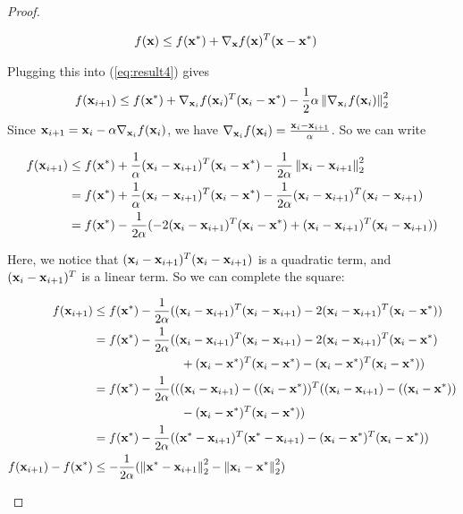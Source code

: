\begin{proof}
\begin{ceqn}
\begin{align*}
            f(\vx) &\leq f(\vx^*) + \nabla_\vx f(\vx)^T(\vx - \vx^*)
        \end{align*}
    \end{ceqn}
    Plugging this into (\ref{eq:result4}) gives
    $$f(\vx_{i+1}) \leq f(\vx^*) + \nabla_{\vx_i} f(\vx_i)^T(\vx_i - \vx^*) - \frac{1}{2}\alpha \norm{\nabla_{\vx_i} f(\vx_i)}_2^2$$
    Since $\vx_{i+1} = \vx_i - \alpha \nabla_{\vx_i} f(\vx_i)$, we have $\nabla_{\vx_i} f(\vx_i) = \frac{\vx_i - \vx_{i+1}}{\alpha}$. So we can write
    \begin{ceqn}
        \begin{align*}
            f(\vx_{i+1}) &\leq f(\vx^*) + \frac{1}{\alpha}(\vx_i - \vx_{i+1})^T(\vx_i - \vx^*) - \frac{1}{2\alpha} \norm{\vx_i - \vx_{i+1}}_2^2 \\
            &= f(\vx^*) + \frac{1}{\alpha}(\vx_i - \vx_{i+1})^T(\vx_i - \vx^*) - \frac{1}{2\alpha} (\vx_i - \vx_{i+1})^T(\vx_i - \vx_{i+1}) \\
            &= f(\vx^*) - \frac{1}{2\alpha} (-2(\vx_i - \vx_{i+1})^T(\vx_i - \vx^*) + (\vx_i - \vx_{i+1})^T(\vx_i - \vx_{i+1}))
        \end{align*}
    \end{ceqn}
    Here, we notice that $(\vx_i - \vx_{i+1})^T(\vx_i - \vx_{i+1})$ is a quadratic term, and $(\vx_i - \vx_{i+1})^T$ is a linear term. So we can complete the square:
    \begin{ceqn}
        \begin{align*}
            f(\vx_{i+1}) &\leq f(\vx^*) - \frac{1}{2\alpha} ((\vx_i - \vx_{i+1})^T(\vx_i - \vx_{i+1}) -2(\vx_i - \vx_{i+1})^T(\vx_i - \vx^*)) \\
            &= f(\vx^*) - \frac{1}{2\alpha} ((\vx_i - \vx_{i+1})^T(\vx_i - \vx_{i+1}) -2(\vx_i - \vx_{i+1})^T(\vx_i - \vx^*) \\ & \hspace{1in} + (\vx_i - \vx^*)^T(\vx_i - \vx^*) - (\vx_i - \vx^*)^T(\vx_i - \vx^*)) \\
            &= f(\vx^*) - \frac{1}{2\alpha} (((\vx_i - \vx_{i+1}) -((\vx_i - \vx^*))^T ((\vx_i - \vx_{i+1}) -((\vx_i - \vx^*)) \\ & \hspace{1in} - (\vx_i - \vx^*)^T(\vx_i - \vx^*)) \\
            &= f(\vx^*) - \frac{1}{2\alpha} ((\vx^* - \vx_{i+1})^T(\vx^* - \vx_{i+1}) - (\vx_i - \vx^*)^T(\vx_i - \vx^*)) \\
            f(\vx_{i+1}) - f(\vx^*) &\leq - \frac{1}{2\alpha} (\norm{\vx^* - \vx_{i+1}}^2_2 - \norm{\vx_i - \vx^*}^2_2)

\end{align*}
\end{ceqn}
\end{proof}
